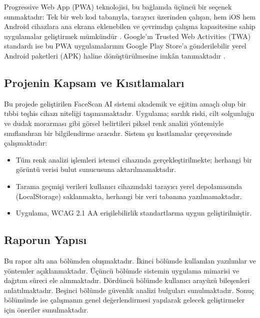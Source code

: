 Progressive Web App (PWA) teknolojisi, bu bağlamda üçüncü bir seçenek sunmaktadır: Tek bir web kod tabanıyla, tarayıcı üzerinden çalışan, hem iOS hem Android cihazlara ana ekrana eklenebilen ve çevrimdışı çalışma kapasitesine sahip uygulamalar geliştirmek mümkündür \cite{biorn2017progressive}. Google'ın Trusted Web Activities (TWA) standardı ise bu PWA uygulamalarının Google Play Store'a gönderilebilir yerel Android paketleri (APK) haline dönüştürülmesine imkân tanımaktadır \cite{google2023twa}.

\subsection{Projenin Kapsam ve Kısıtlamaları}

Bu projede geliştirilen FaceScan AI sistemi akademik ve eğitim amaçlı olup bir tıbbi teşhis cihazı niteliği taşımamaktadır. Uygulama; sarılık riski, cilt solgunluğu ve dudak morarması gibi görsel belirtileri piksel renk analizi yöntemiyle sınıflandıran bir bilgilendirme aracıdır. Sistem şu kısıtlamalar çerçevesinde çalışmaktadır:
\begin{itemize}
  \item Tüm renk analizi işlemleri istemci cihazında gerçekleştirilmekte; herhangi bir görüntü verisi bulut sunucusuna aktarılmamaktadır.
  \item Tarama geçmişi verileri kullanıcı cihazındaki tarayıcı yerel depolamasında (LocalStorage) saklanmakta, herhangi bir veri tabanına yazılmamaktadır.
  \item Uygulama, WCAG 2.1 AA erişilebilirlik standartlarına uygun geliştirilmiştir.
\end{itemize}

\subsection{Raporun Yapısı}

Bu rapor altı ana bölümden oluşmaktadır. İkinci bölümde kullanılan yazılımlar ve yöntemler açıklanmaktadır. Üçüncü bölümde sistemin uygulama mimarisi ve dağıtım süreci ele alınmaktadır. Dördüncü bölümde kullanıcı arayüzü bileşenleri anlatılmaktadır. Beşinci bölümde güvenlik analizi bulguları sunulmaktadır. Sonuç bölümünde ise çalışmanın genel değerlendirmesi yapılarak gelecek geliştirmeler için öneriler sunulmaktadır.
